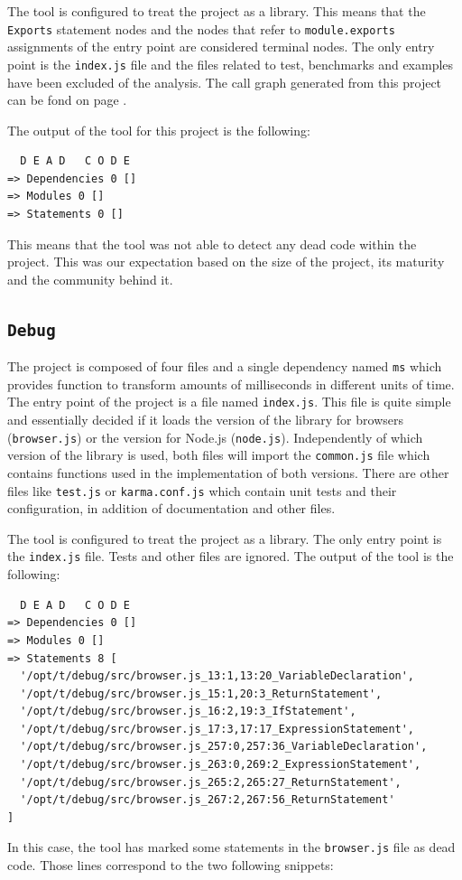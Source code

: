 \documentclass{uvamscse}
\begin{document}
The tool is configured to treat the project as a library. This means that the \texttt{Exports} statement nodes and the nodes that refer to \texttt{module.exports} assignments of the entry point are considered terminal nodes. The only entry point is the \texttt{index.js} file and the files related to test, benchmarks and examples have been excluded of the analysis. The call graph generated from this project can be fond on page \pageref{fig:chalk}.

The output of the tool for this project is the following:
\begin{verbatim}
  D E A D   C O D E
=> Dependencies 0 []
=> Modules 0 []
=> Statements 0 []
\end{verbatim}

This means that the tool was not able to detect any dead code within the project. This was our expectation based on the size of the project, its maturity and the community behind it.
\subsection{\texttt{Debug}}
The project is composed of four files and a single dependency named \texttt{ms} which provides function to transform amounts of milliseconds in different units of time. The entry point of the project is a file named \texttt{index.js}. This file is quite simple and essentially decided if it loads the version of the library for browsers (\texttt{browser.js}) or the version for Node.js (\texttt{node.js}). Independently of which version of the library is used, both files will import the \texttt{common.js} file which contains functions used in the implementation of both versions. There are other files like \texttt{test.js} or \texttt{karma.conf.js} which contain unit tests and their configuration, in addition of documentation and other files.

The tool is configured to treat the project as a library. The only entry point is the \texttt{index.js} file. Tests and other files are ignored. The output of the tool is the following:

\begin{verbatim}
  D E A D   C O D E
=> Dependencies 0 []
=> Modules 0 []
=> Statements 8 [
  '/opt/t/debug/src/browser.js_13:1,13:20_VariableDeclaration',
  '/opt/t/debug/src/browser.js_15:1,20:3_ReturnStatement',
  '/opt/t/debug/src/browser.js_16:2,19:3_IfStatement',
  '/opt/t/debug/src/browser.js_17:3,17:17_ExpressionStatement',
  '/opt/t/debug/src/browser.js_257:0,257:36_VariableDeclaration',
  '/opt/t/debug/src/browser.js_263:0,269:2_ExpressionStatement',
  '/opt/t/debug/src/browser.js_265:2,265:27_ReturnStatement',
  '/opt/t/debug/src/browser.js_267:2,267:56_ReturnStatement'
]
\end{verbatim}
In this case, the tool has marked some statements in the \texttt{browser.js} file as dead code. Those lines correspond to the two following snippets:
\end{document}
